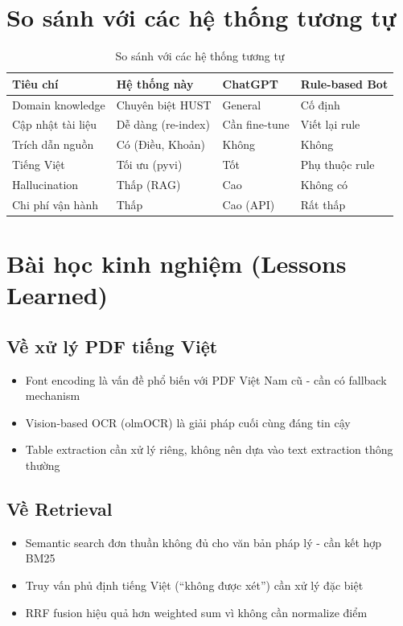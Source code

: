 \documentclass[../DoAn.tex]{subfiles}
\begin{document}
\section{So sánh với các hệ thống tương tự}

\begin{table}[h]
\centering
\begin{tabular}{|l|l|l|l|}
\hline
\textbf{Tiêu chí} & \textbf{Hệ thống này} & \textbf{ChatGPT} & \textbf{Rule-based Bot} \\
\hline
Domain knowledge & Chuyên biệt HUST & General & Cố định \\
\hline
Cập nhật tài liệu & Dễ dàng (re-index) & Cần fine-tune & Viết lại rule \\
\hline
Trích dẫn nguồn & Có (Điều, Khoản) & Không & Không \\
\hline
Tiếng Việt & Tối ưu (pyvi) & Tốt & Phụ thuộc rule \\
\hline
Hallucination & Thấp (RAG) & Cao & Không có \\
\hline
Chi phí vận hành & Thấp & Cao (API) & Rất thấp \\
\hline
\end{tabular}
\caption{So sánh với các hệ thống tương tự}
\end{table}

\section{Bài học kinh nghiệm (Lessons Learned)}

\subsection{Về xử lý PDF tiếng Việt}
\begin{itemize}
    \item Font encoding là vấn đề phổ biến với PDF Việt Nam cũ - cần có fallback mechanism
    \item Vision-based OCR (olmOCR) là giải pháp cuối cùng đáng tin cậy
    \item Table extraction cần xử lý riêng, không nên dựa vào text extraction thông thường
\end{itemize}

\subsection{Về Retrieval}
\begin{itemize}
    \item Semantic search đơn thuần không đủ cho văn bản pháp lý - cần kết hợp BM25
    \item Truy vấn phủ định tiếng Việt (``không được xét'') cần xử lý đặc biệt
    \item RRF fusion hiệu quả hơn weighted sum vì không cần normalize điểm
\end{itemize}
\end{document}
